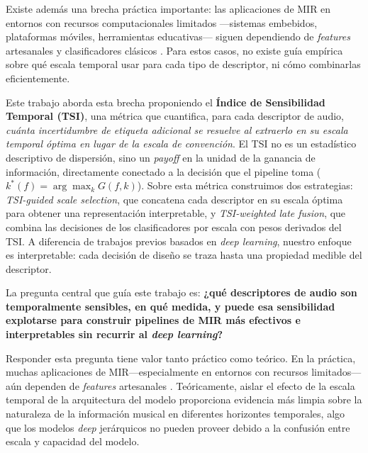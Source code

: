 \documentclass[conference]{IEEEtran}
\begin{document}
Existe además una brecha práctica importante: las aplicaciones de MIR en entornos con recursos computacionales limitados ---sistemas 
embebidos, plataformas móviles, herramientas educativas--- siguen dependiendo de \textit{features} artesanales y clasificadores clásicos 
\cite{ding2023audio, tamm2024comparative}. Para estos casos, no existe guía empírica sobre qué escala temporal usar para cada tipo de descriptor, ni cómo combinarlas eficientemente.

Este trabajo aborda esta brecha proponiendo el \textbf{Índice de Sensibilidad Temporal (TSI)}, una métrica que cuantifica, para cada descriptor de audio, \emph{cuánta incertidumbre de etiqueta adicional se resuelve al extraerlo en su escala temporal óptima en lugar de la escala de convención}. El TSI no es un estadístico descriptivo de dispersión, sino un \emph{payoff} en la unidad de la ganancia de información, directamente conectado a la decisión que el pipeline toma ($k^*(f)=\arg\max_k G(f,k)$). Sobre esta métrica construimos dos estrategias: \textit{TSI-guided scale selection}, que concatena cada descriptor en su escala óptima para obtener una representación interpretable, y \textit{TSI-weighted late fusion}, que combina las decisiones de los clasificadores por escala con pesos derivados del TSI. A diferencia de trabajos previos basados en \textit{deep learning}, nuestro enfoque es interpretable: cada decisión de diseño se traza hasta una propiedad medible del descriptor.

La pregunta central que guía este trabajo es: 
\textbf{¿qué descriptores de audio son temporalmente sensibles, en qué medida, y puede esa sensibilidad explotarse para construir 
pipelines de MIR más efectivos e interpretables sin recurrir al \textit{deep 
learning}?}

Responder esta pregunta tiene valor tanto práctico como teórico.
En la práctica, muchas aplicaciones de MIR---especialmente en entornos con recursos limitados---aún dependen de \textit{features} artesanales \cite{ding2023audio, tamm2024comparative}.
Teóricamente, aislar el efecto de la escala temporal de la arquitectura del modelo proporciona evidencia más limpia sobre la naturaleza de la información musical en diferentes horizontes temporales, algo que los modelos \textit{deep} jerárquicos no pueden proveer debido a la confusión entre escala y capacidad del modelo.
\end{document}
